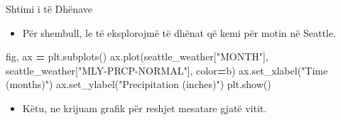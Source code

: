 \documentclass[
  ignorenonframetext,
]{beamer}
\newenvironment{Shaded}{\begin{snugshade}}{\end{snugshade}}
\newcommand{\NormalTok}[1]{#1}
\newcommand{\OperatorTok}[1]{\textcolor[rgb]{0.81,0.36,0.00}{\textbf{#1}}}
\newcommand{\StringTok}[1]{\textcolor[rgb]{0.31,0.60,0.02}{#1}}
\providecommand{\tightlist}{%
  \setlength{\itemsep}{0pt}\setlength{\parskip}{0pt}}
\begin{document}
\begin{frame}[fragile]{Shtimi i të Dhënave}
\protect\hypertarget{shtimi-i-tuxeb-dhuxebnave}{}
\begin{itemize}
\tightlist
\item
  Për shembull, le të eksplorojmë të dhënat që kemi për motin në
  Seattle.
\end{itemize}


\begin{Shaded}
\begin{Highlighting}[]
\NormalTok{fig, ax }\OperatorTok{=}\NormalTok{ plt.subplots()}
\NormalTok{ax.plot(seattle\_weather[}\StringTok{"MONTH"}\NormalTok{], seattle\_weather[}\StringTok{"MLY{-}PRCP{-}NORMAL"}\NormalTok{], color}\OperatorTok{=}\StringTok{\textquotesingle{}b\textquotesingle{}}\NormalTok{)}
\NormalTok{ax.set\_xlabel(}\StringTok{"Time (months)"}\NormalTok{)}
\NormalTok{ax.set\_ylabel(}\StringTok{"Precipitation (inches)"}\NormalTok{)}
\NormalTok{plt.show()}
\end{Highlighting}
\end{Shaded}

\begin{itemize}
\tightlist
\item
  Këtu, ne krijuam grafik për reshjet mesatare gjatë vitit.
\end{itemize}
\end{frame}
\end{document}
